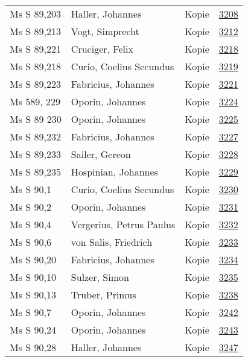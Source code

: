 \documentclass[10pt,a4paper,landscape]{report}
\begin{document}
\begin{longtable}{p{16cm}p{4cm}lr}
Ms S 89,203	&	Haller, Johannes	&	Kopie	&	\href{http://130.60.24.72/assignment/3208}{3208}\\
Ms S 89,213	&	Vogt, Simprecht	&	Kopie	&	\href{http://130.60.24.72/assignment/3212}{3212}\\
Ms S 89,221	&	Cruciger, Felix	&	Kopie	&	\href{http://130.60.24.72/assignment/3218}{3218}\\
Ms S 89,218	&	Curio, Coelius Secundus	&	Kopie	&	\href{http://130.60.24.72/assignment/3219}{3219}\\
Ms S 89,223	&	Fabricius, Johannes	&	Kopie	&	\href{http://130.60.24.72/assignment/3221}{3221}\\
Ms 589, 229	&	Oporin, Johannes	&	Kopie	&	\href{http://130.60.24.72/assignment/3224}{3224}\\
Ms S 89 230	&	Oporin, Johannes	&	Kopie	&	\href{http://130.60.24.72/assignment/3225}{3225}\\
Ms S 89,232	&	Fabricius, Johannes	&	Kopie	&	\href{http://130.60.24.72/assignment/3227}{3227}\\
Ms S 89,233	&	Sailer, Gereon	&	Kopie	&	\href{http://130.60.24.72/assignment/3228}{3228}\\
Ms S 89,235	&	Hospinian, Johannes	&	Kopie	&	\href{http://130.60.24.72/assignment/3229}{3229}\\
Ms S 90,1	&	Curio, Coelius Secundus	&	Kopie	&	\href{http://130.60.24.72/assignment/3230}{3230}\\
Ms S 90,2	&	Oporin, Johannes	&	Kopie	&	\href{http://130.60.24.72/assignment/3231}{3231}\\
Ms S 90,4	&	Vergerius, Petrus Paulus	&	Kopie	&	\href{http://130.60.24.72/assignment/3232}{3232}\\
Ms S 90,6	&	von Salis, Friedrich	&	Kopie	&	\href{http://130.60.24.72/assignment/3233}{3233}\\
Ms S 90,20	&	Fabricius, Johannes	&	Kopie	&	\href{http://130.60.24.72/assignment/3234}{3234}\\
Ms S 90,10	&	Sulzer, Simon	&	Kopie	&	\href{http://130.60.24.72/assignment/3235}{3235}\\
Ms S 90,13	&	Truber, Primus	&	Kopie	&	\href{http://130.60.24.72/assignment/3238}{3238}\\
Ms S 90,7	&	Oporin, Johannes	&	Kopie	&	\href{http://130.60.24.72/assignment/3242}{3242}\\
Ms S 90,24	&	Oporin, Johannes	&	Kopie	&	\href{http://130.60.24.72/assignment/3243}{3243}\\
Ms S 90,28	&	Haller, Johannes	&	Kopie	&	\href{http://130.60.24.72/assignment/3247}{3247}\\

\end{longtable}
\end{document}
